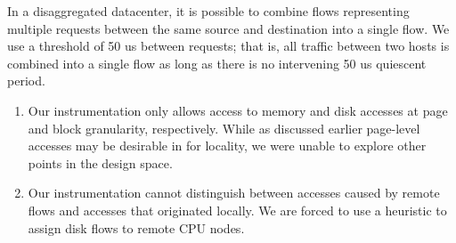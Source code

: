 In a disaggregated datacenter, it is possible to combine flows representing multiple requests between the same source and destination into a single flow. We use a threshold of 50 us between requests; that is, all traffic between two hosts is combined into a single flow as long as there is no intervening 50 us quiescent period. 



\begin{enumerate}
\item Our instrumentation only allows access to memory and disk accesses at page and block granularity, respectively. While as discussed earlier page-level accesses may be desirable in \dis for locality, we were unable to explore other points in the design space.
\item Our instrumentation cannot distinguish between accesses caused by remote flows and accesses that originated locally. We are forced to use a heuristic to assign disk flows to remote CPU nodes.
\end{enumerate}


%
\begin{figure}
  \centering
  \caption{\small{}}
  \label{fig:fsd}
\end{figure}
%

